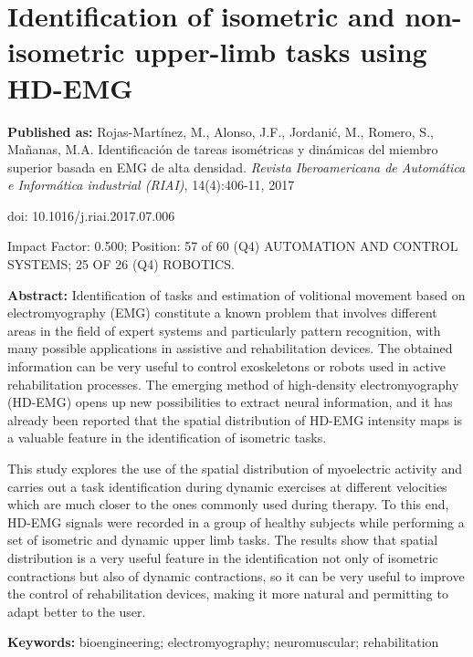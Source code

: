 \newpage
{}


\chapter[Isometric and non-isometric task identification]{Identification of isometric and non-isometric upper-limb tasks using HD-EMG}
\label{RIAI}
\textbf{Published as:} 
Rojas-Mart\'inez, M., Alonso, J.F., Jordani\'c, M., Romero, S., Ma\~nanas, M.A.
Identificación de tareas isométricas y dinámicas del miembro superior basada en EMG de alta densidad.
\textit{Revista Iberoamericana de Autom\'atica e Inform\'atica industrial (RIAI)}, 14(4):406-11, 2017

doi: 10.1016/j.riai.2017.07.006

Impact Factor: 0.500; Position: 57 of 60 (Q4) AUTOMATION AND CONTROL SYSTEMS; 25 OF 26 (Q4) ROBOTICS.


\textbf{Abstract:} Identification of tasks and estimation of volitional movement based on electromyography (EMG) constitute a known problem that involves different areas in the field of expert systems and particularly pattern recognition, with many possible applications in assistive and rehabilitation devices. The obtained information can be very useful to control exoskeletons or robots used in active rehabilitation processes. The emerging method of high-density electromyography (HD-EMG) opens up new possibilities to extract neural information, and it has already been reported that the spatial distribution of HD-EMG intensity maps is a valuable feature in the identification of isometric tasks.

This study explores the use of the spatial distribution of myoelectric activity and carries out a task identification during dynamic exercises at different velocities which are much closer to the ones commonly used during therapy. To this end, HD-EMG signals were recorded in a group of healthy subjects while performing a set of isometric and dynamic upper limb tasks. The results show that spatial distribution is a very useful feature in the identification not only of isometric contractions but also of dynamic contractions, so it can be very useful to improve the control of rehabilitation devices, making it more natural and permitting to adapt better to the user.

\textbf{Keywords:}  bioengineering; electromyography; neuromuscular; rehabilitation

